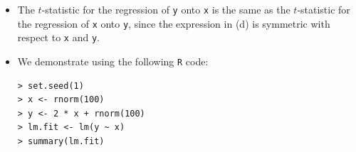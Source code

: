 \begin{itemize}
\begin{proof}
\begin{equation*}
\begin{split}
                        \Biggl[\sum_{i'=1}^n x_{i'}y_{i'}\Biggr] \\
                    &+ x_i^2 {\Biggl[\sum_{i'=1}^n x_{i'}y_{i'}\Biggr]}^2 \Biggr) /
                    {\Biggl[\sum_{i'=1}^n x_{i'}^2\Biggr]}^2,
                \end{split}
            \end{equation*}
            so that
            \begin{equation*}
                \begin{split}
                    \qquad &\Biggl(\sum_{i'=1}^n x_{i'}^2\Biggr)
                    \Biggl[\sum_{i=1}^n {(y_i - x_i\hat{\beta})}^2\Biggr] \\
                    = &\, \Biggl(\sum_{i'=1}^n x_{i'}^2\Biggr)
                    \Biggl(\sum_{i=1}^n y_i^2 - \sum_{i=1}^n
                    {(x_i\hat{\beta})}^2\Biggr) \\
                    = &\, \Biggl(\sum_{i'=1}^n x_{i'}^2\Biggr)
                    \Biggl(\sum_{i'=1}^n y_{i'}^2 \Biggr)
                    - \Biggl(\sum_{i'=1}^n x_{i'}^2\Biggr)
                    \Biggl(\sum_{i=1}^n {(x_i\hat{\beta})}^2\Biggr) \\
                    = &\, \Biggl(\sum_{i=1}^n x_i^2\Biggr)
                    \Biggl(\sum_{i'=1}^n y_{i'}^2 \Biggr)
                    - {\Biggl(\sum_{i'=1}^n x_{i'}y_{i'}\Biggr)}^2.
                \end{split}
            \end{equation*}
            Thus, we have
            \begin{equation*}
                \begin{split}
                    \frac{\hat{\beta}}{\text{SE}(\hat{\beta})}
                    &= \frac{(\sqrt{n - 1})\sum_{i=1}^n x_i y_i}
                    {
                        \sqrt{\bigl(\sum_{i=1}^n x_i^2\bigr)
                            \bigl(\sum_{i'=1}^n y_{i'}^2\bigr)
                        - {\bigl(\sum_{i'=1}^n x_{i'}y_{i'}\bigr)}^2}
                    }.
                \end{split}
            \end{equation*}
        \end{proof}
    \item[(e)] The $t$-statistic for the regression of \verb|y| onto \verb|x| is
        the same as the $t$-statistic for the regression of \verb|x| onto \verb|y|,
        since the expression in (d) is symmetric with respect to \verb|x| and
        \verb|y|.
    \item[(f)] We demonstrate using the following \verb|R| code:
        \begin{lstlisting}
> set.seed(1)
> x <- rnorm(100)
> y <- 2 * x + rnorm(100)
> lm.fit <- lm(y ~ x)
> summary(lm.fit)


\end{lstlisting}
\end{itemize}
